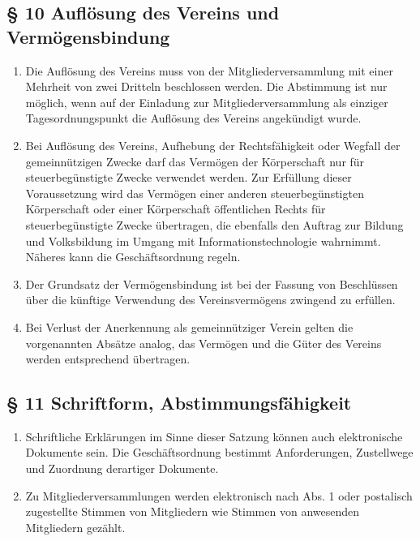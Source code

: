 ﻿\documentclass[10pt,a4paper]{scrartcl}
\begin{document}
\subsection*{§ 10 Auflösung des Vereins und Vermögensbindung}
\begin{enumerate}
	\item Die Auflösung des Vereins muss von der Mitgliederversammlung mit einer Mehrheit von
		zwei Dritteln beschlossen werden. Die Abstimmung ist nur möglich, wenn auf der Einladung
		zur Mitgliederversammlung als einziger Tagesordnungspunkt die Auflösung des Vereins
		angekündigt wurde.
	\item Bei Auflösung des Vereins, Aufhebung der Rechtsfähigkeit oder Wegfall der
		gemeinnützigen Zwecke darf das Vermögen der Körperschaft nur für
		steuerbegünstigte Zwecke verwendet werden. Zur Erfüllung dieser
		Voraussetzung wird das Vermögen einer anderen steu\-er\-be\-güns\-tig\-ten
		Körperschaft oder einer Körperschaft öffentlichen Rechts für
		steuerbegünstigte Zwecke über\-tra\-gen, die ebenfalls den Auftrag
		zur Bildung und Volksbildung im Umgang mit Informationstechnologie
		wahrnimmt. Nä\-he\-res kann die Geschäftsordnung regeln.
	\item Der Grundsatz der Vermögensbindung ist bei der Fassung von
		Beschlüssen über die künf\-ti\-ge Verwendung des Vereinsvermögens zwingend
		zu erfüllen.
	\item Bei Verlust der Anerkennung als gemeinnütziger Verein gelten die vorgenannten Absätze analog, 
		das Vermögen und die Güter des Vereins werden entsprechend übertragen.
\end{enumerate}
%
%
\subsection*{§ 11 Schriftform, Abstimmungsfähigkeit}
\begin{enumerate}
	\item Schriftliche Erklärungen im Sinne dieser Satzung können auch
		elektronische Dokumente sein. Die Geschäftsordnung bestimmt
		Anforderungen, Zustellwege und Zuordnung derartiger Dokumente.
	\item Zu Mitgliederversammlungen werden elektronisch nach Abs. 1 oder
		postalisch zugestellte Stimmen von Mitgliedern wie Stimmen
		von anwesenden Mitgliedern gezählt.
\end{enumerate}
\end{document}
